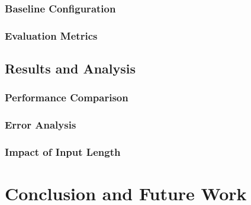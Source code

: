 \subsection{Baseline Configuration}
\subsection{Evaluation Metrics}

\section{Results and Analysis}

\subsection{Performance Comparison}

\subsection{Error Analysis}

\subsection{Impact of Input Length}

\chapter{Conclusion and Future Work}

